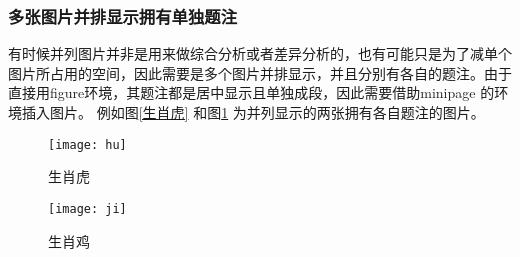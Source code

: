 \subsubsection{多张图片并排显示拥有单独题注}
有时候并列图片并非是用来做综合分析或者差异分析的，也有可能只是为了减单个图片所占用的空间，因此需要是多个图片并排显示，并且分别有各自的题注。由于直接用figure环境，其题注都是居中显示且单独成段，因此需要借助minipage 的环境插入图片。 例如图\ref{生肖虎}
和图\ref{生肖鸡}
为并列显示的两张拥有各自题注的图片。
\begin{figure}[htbp]
	\centering
	\begin{minipage}[htbp]{0.48\linewidth}
		\centering
		\texttt{[image: hu]}	%
		\caption{生肖虎} \label{生肖虎}
	\end{minipage}
\begin{minipage}[htbp]{0.48\linewidth}
	\centering
	\texttt{[image: ji]}
	\caption{生肖鸡} \label{生肖鸡}
\end{minipage}
\end{figure}